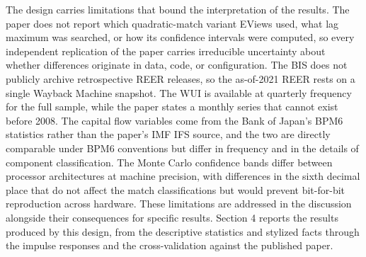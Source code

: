 The design carries limitations that bound the interpretation of the results. The paper does not report which quadratic-match variant EViews used, what lag maximum was searched, or how its confidence intervals were computed, so every independent replication of the paper carries irreducible uncertainty about whether differences originate in data, code, or configuration. The BIS does not publicly archive retrospective REER releases, so the as-of-2021 REER rests on a single Wayback Machine snapshot. The WUI is available at quarterly frequency for the full sample, while the paper states a monthly series that cannot exist before 2008. The capital flow variables come from the Bank of Japan's BPM6 statistics rather than the paper's IMF IFS source, and the two are directly comparable under BPM6 conventions but differ in frequency and in the details of component classification. The Monte Carlo confidence bands differ between processor architectures at machine precision, with differences in the sixth decimal place that do not affect the match classifications but would prevent bit-for-bit reproduction across hardware. These limitations are addressed in the discussion alongside their consequences for specific results. Section 4 reports the results produced by this design, from the descriptive statistics and stylized facts through the impulse responses and the cross-validation against the published paper.
